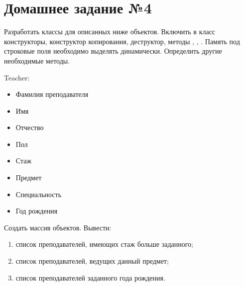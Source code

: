 \section*{Домашнее задание №4}

Разработать классы для описанных ниже объектов. Включить в класс
конструкторы, конструктор копирования, деструктор, методы ,
, . Память под строковые поля необходимо выделять
динамически. Определить другие необходимые методы.

Teacher:
\begin{itemize}
	\item Фамилия преподавателя
	\item Имя
	\item Отчество
	\item Пол
	\item Стаж
	\item Предмет
	\item Специальность
	\item Год рождения
\end{itemize}

Создать массив объектов. Вывести:
\begin{enumerate}
	\item список преподавателей, имеющих стаж больше заданного;
	\item список преподавателей, ведущих данный предмет;
	\item список преподавателей заданного года рождения.
\end{enumerate}
